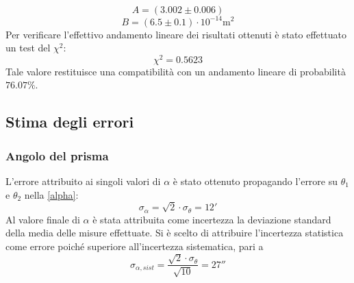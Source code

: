 \documentclass[]{article}
\let\oldsubsection\subsection%
\renewcommand{\subsection}{%
	\renewcommand{\theequation}{\thesubsection.\arabic{equation}}%
	\oldsubsection}%
\begin{document}
    \begin{equation}
        \label{A}
        A = (3.002 \pm 0.006) 
    \end{equation}
    \begin{equation}
        \label{B}
        B = (6.5 \pm 0.1) \cdot 10^{-14} \text{m}^2
    \end{equation}
    Per verificare l'effettivo andamento lineare dei risultati ottenuti è stato effettuato un test del $\chi^2$:
    \begin{equation}
        \label{chi2}
        \chi^2 = 0.5623 
    \end{equation}
    Tale valore restituisce una compatibilità con un andamento lineare di probabilità $76.07 \% $.
    
    \subsection{Stima degli errori}
    \subsubsection{Angolo del prisma}
    L'errore attribuito ai singoli valori di $\alpha$ è stato ottenuto propagando l'errore su $\theta_1$ e $\theta_2$ nella \ref{alpha}:
    \begin{equation}
        \label{alpha-err}
        \sigma_{\alpha} = \sqrt{2} \cdot \sigma_{\theta} = 12'
    \end{equation}
    Al valore finale di $\alpha$ è stata attribuita come incertezza la deviazione standard della media delle misure effettuate. Si è scelto di attribuire l'incertezza statistica come errore poiché superiore all'incertezza sistematica, pari a
    \begin{equation}
        \label{alpha-err-sist}
        \sigma_{\alpha, sist}= \frac{\sqrt{2} \cdot \sigma_{\theta}}{\sqrt{10}}=27''
    \end{equation}
    \label{par:alpha_err}
\end{document}
